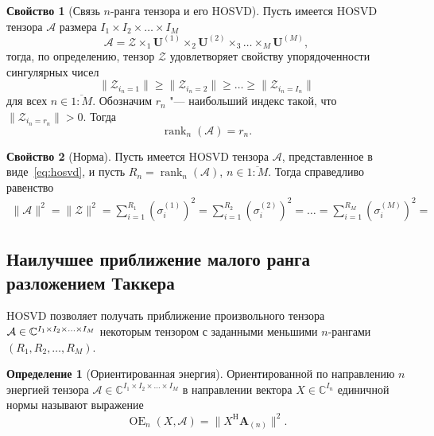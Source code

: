 \documentclass[specialist,
    substylefile = spbu.rtx,
    subf,href,colorlinks=true, 12pt]{disser}
\theoremstyle{plain}
\theoremstyle{definition}
\newtheorem{definition}{Определение}[section]
\newtheorem{property}{Свойство}[section]
\theoremstyle{remark}
\begin{document}
    \begin{property}
    [Связь $n$-ранга тензора и его HOSVD]
        \label{property:n-rank}
        Пусть имеется HOSVD тензора $\mathcal{A}$ размера $I_1\times I_2\times \ldots \times I_M$
        \[\mathcal{A} = \mathcal{Z}\times_1 \mathbf{U}^{(1)}\times_2\mathbf{U}^{(2)}\times_3\ldots \times_{M}\mathbf{U}^{(M)},\]
        тогда, по определению, тензор $\mathcal{Z}$ удовлетворяет свойству упорядоченности сингулярных чисел
        \[\|\mathcal{Z}_{i_n=1}\|\geqslant\|\mathcal{Z}_{i_n=2}\|\geqslant\ldots \geqslant \|\mathcal{Z}_{i_n=I_n}\|\]
        для всех $n\in \overline{1:M}$.
        Обозначим $r_n$ "--- наибольший индекс такой, что $\|\mathcal{Z}_{i_n=r_n}\|>0$.
        Тогда
        \begin{equation}
            \operatorname{rank}_n(\mathcal{A})=r_n.\label{eq:n-rank}
        \end{equation}
    \end{property}

    \begin{property}[Норма]
        \label{property:norm}
        Пусть имеется HOSVD тензора $\mathcal{A}$, представленное в виде~\eqref{eq:hosvd}, и пусть $R_n=\operatorname{rank}_n(\mathcal{A})$,
        $n\in \overline{1:M}$.
        Тогда справедливо равенство
        \begin{align*}
            \|\mathcal{A}\|^2=\|\mathcal{Z}\|^2 =\sum_{i=1}^{R_1}\left( \sigma_i^{(1)} \right)^2=\sum_{i=1}^{R_2}\left( \sigma_i^{(2)} \right)^2
            =\ldots =\sum_{i=1}^{R_M}\left( \sigma_i^{(M)} \right)^2=
        \end{align*}
    \end{property}
    
    \subsection{Наилучшее приближение малого ранга разложением Таккера}
    HOSVD позволяет получать приближение произвольного тензора 
    $\mathcal{A}\in \mathbb{C}^{I_1 \times I_2 \times \ldots \times I_M}$ некоторым тензором с заданными меньшими $n$-рангами
    $(R_1, R_2, \ldots, R_M)$.
    
    \begin{definition}[Ориентированная энергия]
        Ориентированной по направлению $n$ энергией тензора $\mathcal{A}\in \mathbb{C}^{I_1\times I_2\times \ldots \times I_M}$ в направлении
        вектора $X\in \mathbb{C}^{I_n}$ единичной нормы называют выражение
        \[
            \operatorname{OE}_n(X, \mathcal{A}) = \|X^{\mathrm{H}}\mathbf{A}_{(n)}\|^2.
        \]
    \end{definition}
\end{document}
